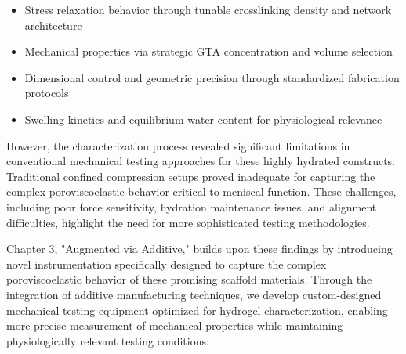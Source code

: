 \begin{itemize}
    \item Stress relaxation behavior through tunable crosslinking density and network architecture
    \item Mechanical properties via strategic GTA concentration and volume selection
    \item Dimensional control and geometric precision through standardized fabrication protocols
    \item Swelling kinetics and equilibrium water content for physiological relevance
\end{itemize}

However, the characterization process revealed significant limitations in conventional mechanical testing approaches for these highly hydrated constructs. Traditional confined compression setups proved inadequate for capturing the complex poroviscoelastic behavior critical to meniscal function. These challenges, including poor force sensitivity, hydration maintenance issues, and alignment difficulties, highlight the need for more sophisticated testing methodologies.

Chapter 3, "Augmented via Additive," builds upon these findings by introducing novel instrumentation specifically designed to capture the complex poroviscoelastic behavior of these promising scaffold materials. Through the integration of additive manufacturing techniques, we develop custom-designed mechanical testing equipment optimized for hydrogel characterization, enabling more precise measurement of mechanical properties while maintaining physiologically relevant testing conditions.
